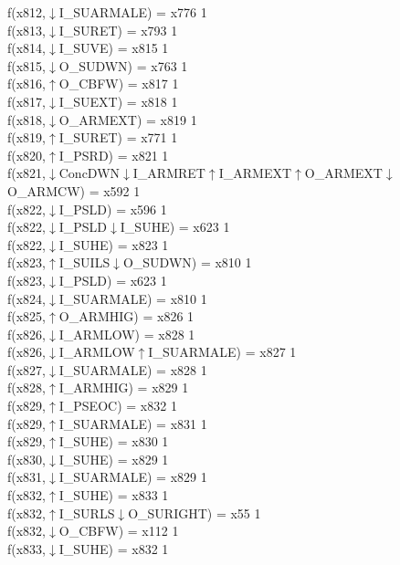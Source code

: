 f(x812,$\downarrow$I\_SUARMALE) = x776 {1} \\
f(x813,$\downarrow$I\_SURET) = x793 {1} \\
f(x814,$\downarrow$I\_SUVE) = x815 {1} \\
f(x815,$\downarrow$O\_SUDWN) = x763 {1} \\
f(x816,$\uparrow$O\_CBFW) = x817 {1} \\
f(x817,$\downarrow$I\_SUEXT) = x818 {1} \\
f(x818,$\downarrow$O\_ARMEXT) = x819 {1} \\
f(x819,$\uparrow$I\_SURET) = x771 {1} \\
f(x820,$\uparrow$I\_PSRD) = x821 {1} \\
f(x821,$\downarrow$ConcDWN$\downarrow$I\_ARMRET$\uparrow$I\_ARMEXT$\uparrow$O\_ARMEXT$\downarrow$O\_ARMCW) = x592 {1} \\
f(x822,$\downarrow$I\_PSLD) = x596 {1} \\
f(x822,$\downarrow$I\_PSLD$\downarrow$I\_SUHE) = x623 {1} \\
f(x822,$\downarrow$I\_SUHE) = x823 {1} \\
f(x823,$\uparrow$I\_SUILS$\downarrow$O\_SUDWN) = x810 {1} \\
f(x823,$\downarrow$I\_PSLD) = x623 {1} \\
f(x824,$\downarrow$I\_SUARMALE) = x810 {1} \\
f(x825,$\uparrow$O\_ARMHIG) = x826 {1} \\
f(x826,$\downarrow$I\_ARMLOW) = x828 {1} \\
f(x826,$\downarrow$I\_ARMLOW$\uparrow$I\_SUARMALE) = x827 {1} \\
f(x827,$\downarrow$I\_SUARMALE) = x828 {1} \\
f(x828,$\uparrow$I\_ARMHIG) = x829 {1} \\
f(x829,$\uparrow$I\_PSEOC) = x832 {1} \\
f(x829,$\uparrow$I\_SUARMALE) = x831 {1} \\
f(x829,$\uparrow$I\_SUHE) = x830 {1} \\
f(x830,$\downarrow$I\_SUHE) = x829 {1} \\
f(x831,$\downarrow$I\_SUARMALE) = x829 {1} \\
f(x832,$\uparrow$I\_SUHE) = x833 {1} \\
f(x832,$\uparrow$I\_SURLS$\downarrow$O\_SURIGHT) = x55 {1} \\
f(x832,$\downarrow$O\_CBFW) = x112 {1} \\
f(x833,$\downarrow$I\_SUHE) = x832 {1} \\
